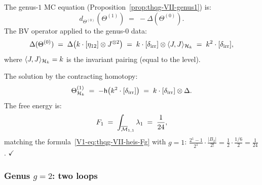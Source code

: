 \begin{computation}
The genus-$1$ MC equation
(Proposition~\ref{prop:thqg-VII-genus1}) is:
\begin{equation}%
d_{\Theta^{(0)}}(\Theta^{(1)})
\;=\;
-\Delta(\Theta^{(0)}).
\end{equation}
The BV operator applied to the genus-$0$ data:
\begin{equation}%
\Delta(\Theta^{(0)})
\;=\;
\Delta\bigl(k \cdot [\eta_{12}] \otimes J^{\otimes 2}\bigr)
\;=\;
k \cdot [\delta_{\mathrm{irr}}] \otimes
\langle J, J \rangle_{\cH_k}
\;=\;
k^2 \cdot [\delta_{\mathrm{irr}}],
\end{equation}
where $\langle J, J \rangle_{\mathcal{H}_k} = k$ is the invariant
pairing (equal to the level).

The solution by the contracting homotopy:
\begin{equation}%
\Theta^{(1)}_{\cH_k}
\;=\;
-\hCont\bigl(k^2 \cdot [\delta_{\mathrm{irr}}]\bigr)
\;=\;
k \cdot [\delta_{\mathrm{irr}}] \otimes \Delta.
\end{equation}
The free energy is:
\begin{equation}%
F_1
\;=\;
\int_{\overline{\cM}_{1,1}} \lambda_1
\;=\;
\frac{1}{24},
\end{equation}
matching the formula~\eqref{V1-eq:thqg-VII-heis-Fg} with $g = 1$:
$\frac{2^1 - 1}{2^1} \cdot \frac{|B_2|}{2!}
= \frac{1}{2} \cdot \frac{1/6}{2} = \frac{1}{24}$. $\checkmark$
\end{computation}

\subsubsection{Genus $g = 2$: two loops}


